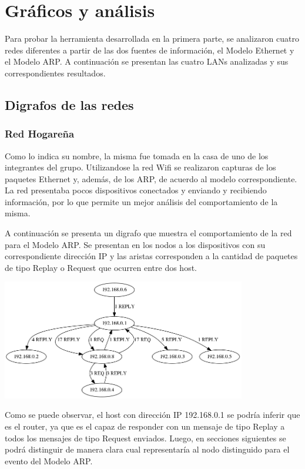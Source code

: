 \section{Gráficos y análisis}
Para probar la herramienta desarrollada en la primera parte, se analizaron cuatro redes diferentes a partir de las dos fuentes de información, el Modelo Ethernet y el Modelo ARP. 
A continuación se presentan las cuatro LANs analizadas y sus correspondientes resultados. 

\subsection{Digrafos de las redes}\label{"Grafos"}

\subsubsection{Red Hogareña}
Como lo indica su nombre, la misma fue tomada en la casa de uno de los integrantes del grupo. Utilizandose la red Wifi se realizaron capturas de los paquetes Ethernet y, además, de los ARP, de acuerdo al modelo correspondiente. La red presentaba pocos dispositivos conectados y enviando y recibiendo información, por lo que permite un mejor análisis del comportamiento de la misma. 

A continuación se presenta un digrafo que muestra el comportamiento de la red para el Modelo ARP. Se presentan en los nodos a los dispositivos con su correspondiente dirección IP y las aristas corresponden a la cantidad de paquetes de tipo Replay o Request que ocurren entre dos host. 

\begin{center}
\includegraphics[width=0.8\textwidth]{./graficos/grafos-arp/grafo_casa_mari.png}
\end{center}

Como se puede observar, el host con dirección IP 192.168.0.1 se podría inferir que es el router, ya que es el capaz de responder con un mensaje de tipo Replay a todos los mensajes de tipo Request enviados. Luego, en secciones siguientes se podrá distinguir de manera clara cual representaría al nodo distinguido para el evento del Modelo ARP. 


